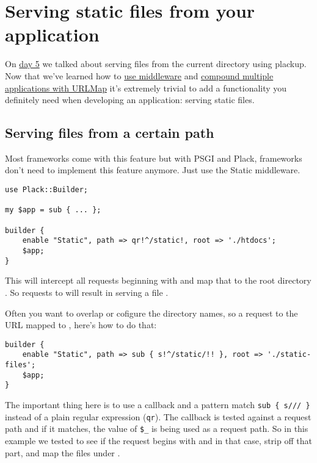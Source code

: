 \chapter{Serving static files from your
application}\label{day-17-serving-static-files-from-your-application}

On
\href{http://advent.plackperl.org/2009/12/day-5-run-a-static-file-web-server-with-plack.html}{day
5} we talked about serving files from the current directory using
plackup. Now that we've learned how to
\href{http://advent.plackperl.org/2009/12/day-10-using-plack-middleware.html}{use
middleware} and
\href{http://advent.plackperl.org/2009/12/day-12-maps-multiple-apps-with-mount-and-urlmap.html}{compound
multiple applications with URLMap} it's extremely trivial to add a
functionality you definitely need when developing an application:
serving static files.

\section{Serving files from a certain
path}\label{serving-files-from-a-certain-path}

Most frameworks come with this feature but with PSGI and Plack,
frameworks don't need to implement this feature anymore. Just use the
Static middleware.

\begin{lstlisting}
use Plack::Builder;

my $app = sub { ... };

builder {
    enable "Static", path => qr!^/static!, root => './htdocs';
    $app;
}
\end{lstlisting}

This will intercept all requests beginning with  and map that
to the root directory . So requests to
 will result in serving a file
.

Often you want to overlap or cofigure the directory names, so a request
to the URL  mapped to ,
here's how to do that:

\begin{lstlisting}
builder {
    enable "Static", path => sub { s!^/static/!! }, root => './static-files';
    $app;
}
\end{lstlisting}

The important thing here is to use a callback and a pattern match
\lstinline!sub { s/// }! instead of a plain regular expression
(\lstinline!qr!). The callback is tested against a request path and if
it matches, the value of \lstinline!$_! is being used as a request path.
So in this example we tested to see if the request begins with
 and in that case, strip off that part, and map the files
under .

